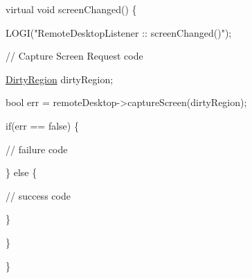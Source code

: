 \begin{DoxyPre} 	 virtual void screenChanged() \{\end{DoxyPre}



\begin{DoxyPre} 		 LOGI("RemoteDesktopListener :: screenChanged()");\end{DoxyPre}



\begin{DoxyPre}		   	 // Capture Screen Request code\end{DoxyPre}



\begin{DoxyPre}			 \hyperlink{classknoxremotedesktop_1_1DirtyRegion}{DirtyRegion} dirtyRegion;\end{DoxyPre}



\begin{DoxyPre}			 bool err = remoteDesktop->captureScreen(dirtyRegion);\end{DoxyPre}



\begin{DoxyPre}			 if(err == false)  \{\end{DoxyPre}



\begin{DoxyPre}				 // failure code\end{DoxyPre}



\begin{DoxyPre}			\} else \{\end{DoxyPre}



\begin{DoxyPre}				 // success code\end{DoxyPre}



\begin{DoxyPre}			\}\end{DoxyPre}



\begin{DoxyPre}		  \}\end{DoxyPre}



\begin{DoxyPre}	   \}\end{DoxyPre}



